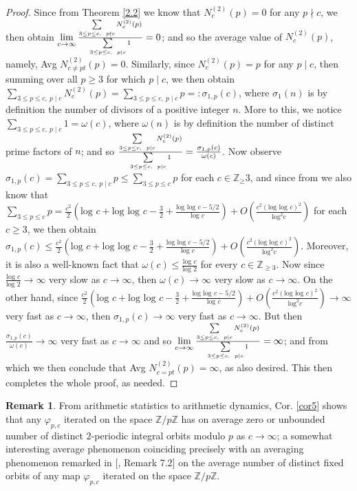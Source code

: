 \documentclass{article}
\theoremstyle{plain}
\theoremstyle{definition}
\newtheorem{rem}[thm]{Remark}
\begin{document}
\begin{proof}
Since from Theorem \ref{2.2} we know that $N_{c}^{(2)}(p) = 0$ for any $p\nmid c$, we then obtain $\lim\limits_{c\to\infty} \Large{\frac{\sum\limits_{3\leq p\leq c, \ p\nmid c}N_{c}^{(2)}(p)}{\Large{\sum\limits_{3\leq p\leq c, \ p\mid c}1}}} = 0$; and so the average value of $N_{c}^{(2)}(p)$, namely, Avg $N_{c \neq pt}^{(2)}(p)=0$. Similarly, since $N_{c}^{(2)}(p) = p$ for any $p\mid c$, then summing over all $p\geq 3$ for which $p\mid c$, we then obtain $\sum\limits_{3\leq p\leq c, \ p\mid c}N_{c}^{(2)}(p) = \sum\limits_{3\leq p\leq c, \ p\mid c}p =: \sigma_{1,p}(c)$, where $\sigma_{1}(n)$ is by definition the number of divisors of a positive integer $n$. More to this, we notice $\sum\limits_{3\leq p\leq c, \ p\mid c}1 = \omega(c)$, where $\omega(n)$ is by definition the number of distinct prime factors of $n$; and so $\Large{\frac{\sum\limits_{3\leq p\leq c, \ p\mid c}N_{c}^{(2)}(p)}{\Large{\sum\limits_{3\leq p\leq c, \ p\mid c}1}}} = \frac{\sigma_{1,p}(c)}{\omega(c)}$. Now observe $\sigma_{1,p}(c)=\sum\limits_{3\leq p \leq c, \ p\mid c}p\leq \sum\limits_{3\leq p\leq c}p$ for each $c\in \mathbb{Z}_\geq 3$, and since from \cite{Ma} we also know that $\sum\limits_{3\leq p\leq c}p = \frac{c^2}{2}(\text{log }c + \text{log log }c - \frac{3}{2}+\frac{\text{log log }c - 5\slash 2}{\text{log }c}) + O(\frac{c^2(\text{log log }c)^2}{\text{log}^2c})$ for each $c\geq 3$, we then obtain $\sigma_{1,p}(c)\leq \frac{c^2}{2}(\text{log }c + \text{log log }c - \frac{3}{2}+\frac{\text{log log }c - 5\slash 2}{\text{log }c}) + O(\frac{c^2(\text{log log }c)^2}{\text{log}^2c})$. Moreover, it is also a well-known fact that $\omega(c)\leq \frac{\text{log }c}{\text{log }2}$ for every $c\in \mathbb{Z}_{\geq 3}$. Now since $\frac{\text{log }c}{\text{log }2} \to \infty$ very slow as $c\to \infty$, then  $\omega(c)\to \infty$ very slow as $c\to \infty$. On the other hand, since $\frac{c^2}{2}(\text{log }c + \text{log log }c - \frac{3}{2}+\frac{\text{log log }c - 5\slash 2}{\text{log }c}) + O(\frac{c^2(\text{log log }c)^2}{\text{log}^2c})\to \infty$ very fast as $c\to \infty$, then $\sigma_{1,p}(c) \to \infty$ very fast as $c\to \infty$. But then $\frac{\sigma_{1,p}(c)}{\omega(c)} \to \infty$ very fast as $c\to \infty$ and so $\lim\limits_{c\to\infty} \Large{\frac{\sum\limits_{3\leq p\leq c, \ p\mid c}N_{c}^{(2)}(p)}{\Large{\sum\limits_{3\leq p\leq c, \ p\mid c}1}}}= \infty$; and from which we then conclude that Avg $N_{c = pt}^{(2)}(p) = \infty$, as also desired. This then completes the whole proof, as needed.
\end{proof} 
\begin{rem} \label{re4.2}
From arithmetic statistics to arithmetic dynamics, Cor. \ref{cor5} shows that any $\varphi_{p,c}$ iterated on the space $\mathbb{Z} / p\mathbb{Z}$ has on average zero or unbounded number of distinct $2$-periodic integral orbits modulo $p$ as $c\to \infty$; a somewhat interesting average phenomenon coinciding precisely with an averaging phenomenon remarked in [\cite{BK3}, Remark 7.2] on the average number of distinct fixed orbits of any map $\varphi_{p,c}$ iterated on the space $\mathbb{Z} / p\mathbb{Z}$.
\end{rem}
\end{document}

